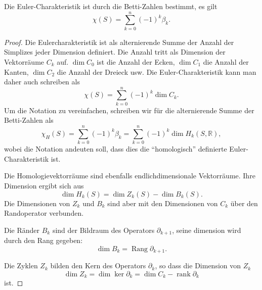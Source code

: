 \begin{satz}
\label{buch:topologie:simplex:satz:euler-betti}
Die Euler-Charakteristik ist durch die Betti-Zahlen bestimmt,
es gilt
\[
\chi(S)
=
\sum_{k=0}^n (-1)^k \beta_k.
\]
\end{satz}

\begin{proof}
Die Eulercharakteristik ist als alternierende Summe der Anzahl der Simplizes 
jeder Dimension definiert.
Die Anzahl tritt als Dimension der Vektorräume $C_k$ auf.
$\dim C_0$ ist die Anzahl der Ecken, $\dim C_1$ die Anzahl der Kanten,
$\dim C_2$ die Anzahl der Dreieck usw.
Die Euler-Charakteristik kann man daher auch schreiben als
\[
\chi(S)
=
\sum_{k=0}^n (-1)^k \dim C_k.
\]
Um die Notation zu vereinfachen, schreiben wir für die alternierende
Summe der Betti-Zahlen als
\[
\chi_H(S)
=
\sum_{k=0}^n
(-1)^k \beta_k
=
\sum_{k=0}^n
(-1)^k \dim H_k(S,\mathbb{R}),
\]
wobei die Notation andeuten soll, dass dies die ``homologisch''
definierte Euler-Charakteristik ist.

Die Homologievektorräume sind ebenfalls endlichdimensionale Vektorräume.
Ihre Dimension ergibt sich aus
\[
\dim H_k(S)
=
\dim Z_k(S) - \dim B_k(S).
\]
Die Dimensionen von $Z_k$ und $B_k$ sind aber mit den Dimensionen von
$C_k$ über den Randoperator verbunden.

Die Ränder $B_k$ sind der Bildraum des Operators $\partial_{k+1}$, seine
dimension wird durch den Rang gegeben:
\begin{equation}
\dim B_k
= 
\operatorname{Rang} \partial_{k+1}.
\label{buch:topologie:simplex:eqn:dimb}
\end{equation}

Die Zyklen $Z_k$ bilden den Kern des Operators $\partial_k$, so dass
die Dimension von $Z_k$
\begin{equation}
\dim Z_k
=
\dim\ker \partial_k
=
\dim C_k - \operatorname{rank} \partial_k
\label{buch:topologie:simplex:eqn:dimz}
\end{equation}
ist.


\end{proof}
